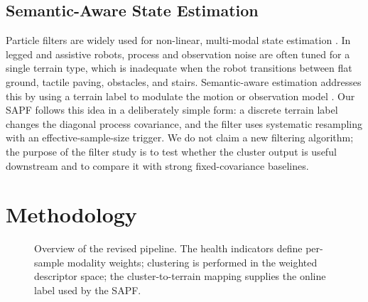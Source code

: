 \documentclass[final,3p,times]{elsarticle}
\begin{document}
\subsection{Semantic-Aware State Estimation}
Particle filters are widely used for non-linear, multi-modal state estimation \cite{thrun2005probabilistic}. In legged and assistive robots, process and observation noise are often tuned for a single terrain type, which is inadequate when the robot transitions between flat ground, tactile paving, obstacles, and stairs. Semantic-aware estimation addresses this by using a terrain label to modulate the motion or observation model \cite{cadena2016past, miki2022learning}. Our SAPF follows this idea in a deliberately simple form: a discrete terrain label changes the diagonal process covariance, and the filter uses systematic resampling with an effective-sample-size trigger. We do not claim a new filtering algorithm; the purpose of the filter study is to test whether the cluster output is useful downstream and to compare it with strong fixed-covariance baselines.

\section{Methodology}
\label{sec:methodology}
\begin{figure}[t]
\centering
{}
\caption{Overview of the revised pipeline. The health indicators define per-sample modality weights; clustering is performed in the weighted descriptor space; the cluster-to-terrain mapping supplies the online label used by the SAPF.}
\label{fig:pipeline}
\end{figure}
\end{document}
